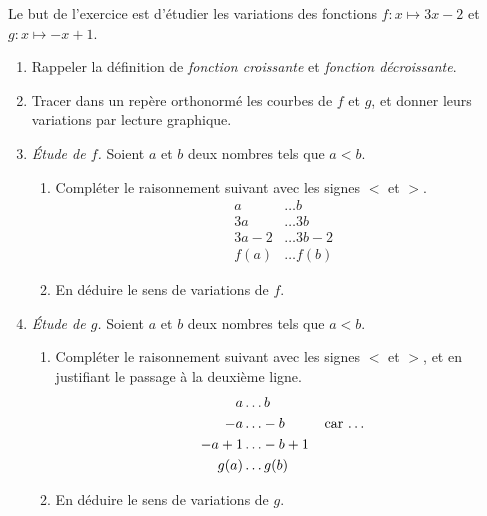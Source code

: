 \documentclass[12pt]{article}
\begin{document}
\begin{exercice}
  Le but de l'exercice est d'étudier les variations des fonctions $f:x\mapsto 3x-2$ et $g:x\mapsto -x+1$.
  \begin{enumerate}
    \item Rappeler la définition de \emph{fonction croissante} et \emph{fonction décroissante}.
    \item Tracer dans un repère orthonormé les courbes de $f$ et $g$, et donner leurs variations par lecture graphique.
    \item \emph{Étude de $f$.} Soient $a$ et $b$ deux nombres tels que $a<b$.
      \begin{enumerate}
        \item Compléter le raisonnement suivant avec les signes $<$ et $>$.
          \begin{align*}
            a &\ldots b\\
            3a & \ldots 3b\\
            3a-2 &\ldots 3b-2\\
            f(a) &\ldots f(b)
          \end{align*}
        \item En déduire le sens de variations de $f$.
      \end{enumerate}
    \item \emph{Étude de $g$.} Soient $a$ et $b$ deux nombres tels que $a<b$.
      \begin{enumerate}
        \item Compléter le raisonnement suivant avec les signes $<$ et $>$, et en justifiant le passage à la deuxième ligne.
          \begin{align*}
            a &\ldots b\\
            -a & \ldots -b \text{\hspace{1cm}car \ldots}\\
            -a+1 &\ldots -b+1\\
            g(a) &\ldots g(b)
          \end{align*}
        \item En déduire le sens de variations de $g$.
      \end{enumerate}
  \end{enumerate}
\end{exercice}
\end{document}
